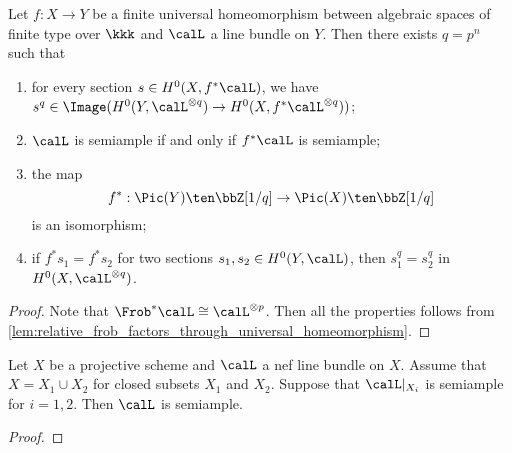     \begin{proposition}\label{prop:Pic_finite_universal_homeomorphism}
        Let \(f:X \to Y\) be a finite universal homeomorphism between algebraic spaces of finite type over \(\kkk\) and \(\calL\) a line bundle on \(Y\).
        Then there exists \(q=p^n\) such that 
        \begin{enumerate}
            \item for every section \(s \in H^0(X, f^*\calL)\), we have \(s^q \in \Image(H^0(Y,\calL^{\otimes q}) \to H^0(X, f^*\calL^{\otimes q}))\);
            \item \(\calL\) is semiample if and only if \(f^*\calL\) is semiample;
            \item the map 
                \[ f^*: \Pic(Y) \ten \bbZ[1/q] \to \Pic(X) \ten \bbZ[1/q] \]
                is an isomorphism;
            \item if \(f^*s_1 = f^*s_2\) for two sections \(s_1,s_2 \in H^0(Y,\calL)\), then \(s_1^q = s_2^q\) in \(H^0(X,\calL^{\otimes q})\).
        \end{enumerate}
    \end{proposition}
    \begin{proof}
        Note that \(\Frob^*\calL \cong \calL^{\otimes p}\).
        Then all the properties follows from \cref{lem:relative_frob_factors_through_universal_homeomorphism}.
    \end{proof}

    \begin{proposition}\label{prop:semiample_for_reducible}
        Let \(X\) be a projective scheme and \(\calL\) a nef line bundle on \(X\).
        Assume that \(X = X_1 \cup X_2\) for closed subsets \(X_1\) and \(X_2\).
        Suppose that \(\calL|_{X_i}\) is semiample for \(i = 1,2\).
        Then \(\calL\) is semiample.
    \end{proposition}
    \begin{proof}
    \end{proof}

